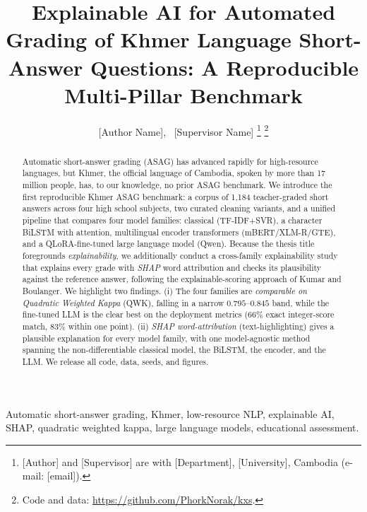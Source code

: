 \documentclass[journal]{IEEEtran}
\begin{document}
\title{Explainable AI for Automated Grading of Khmer Language
Short-Answer Questions: A Reproducible Multi-Pillar Benchmark}

\author{[Author Name],~
        [Supervisor Name]%
\thanks{[Author] and [Supervisor] are with [Department], [University], Cambodia
(e-mail: [email]).}%
\thanks{Code and data: \url{https://github.com/PhorkNorak/kxs}.}}

\maketitle

\begin{abstract}
Automatic short-answer grading (ASAG) has advanced rapidly for high-resource languages, but
Khmer, the official language of Cambodia, spoken by more than 17 million people, has, to our
knowledge, no prior ASAG benchmark. We introduce the first reproducible Khmer ASAG benchmark: a
corpus of 1{,}184 teacher-graded short answers across four high school subjects, two curated
cleaning variants, and a unified pipeline that compares four model families: classical
(TF-IDF$+$SVR), a character BiLSTM with attention, multilingual encoder transformers
(mBERT/XLM-R/GTE), and a QLoRA-fine-tuned large language model (Qwen). Because the thesis title
foregrounds \emph{explainability}, we additionally conduct a cross-family explainability study
that explains every grade with \emph{SHAP} word attribution and checks its plausibility against the
reference answer, following the explainable-scoring approach of Kumar and Boulanger. We highlight two findings.
(i) The four families are \emph{comparable on Quadratic Weighted Kappa} (QWK), falling in a narrow
$0.795$--$0.845$ band, while the fine-tuned LLM is the clear best on the deployment metrics
(66\% exact integer-score match, 83\% within one point). (ii)
\emph{SHAP word-attribution} (text-highlighting) gives a plausible explanation for every model family,
with one model-agnostic method spanning the non-differentiable classical model, the BiLSTM, the
encoder, and the LLM. We release all code, data, seeds, and figures.
\end{abstract}

\begin{IEEEkeywords}
Automatic short-answer grading, Khmer, low-resource NLP, explainable AI, SHAP,
quadratic weighted kappa, large language models, educational assessment.
\end{IEEEkeywords}
\end{document}
